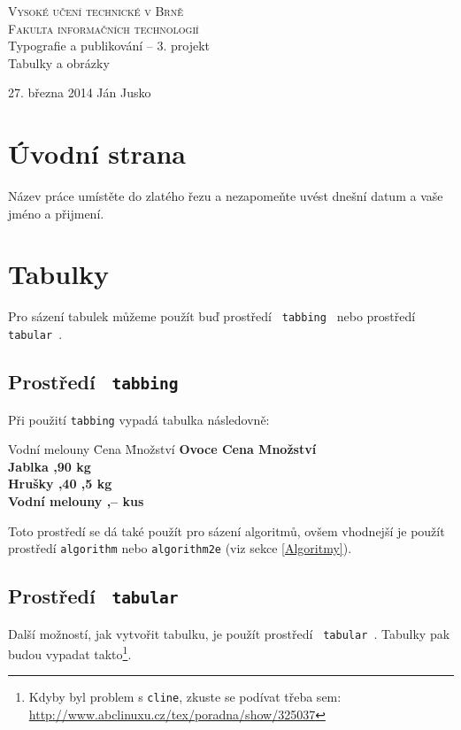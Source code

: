 \documentclass[a4paper,11pt]{article}
\begin{document}
\begin{titlepage}
\begin{center}
	\Huge
	\textsc{Vysoké učení technické v Brně\\
	\huge Fakulta informačních technologií}\\
{ \LARGE Typografie a publikování -- 3. projekt\\
\Huge Tabulky a obrázky\\}
\end{center}
{\Large 27. března 2014 \hfill
Ján Jusko}
\end{titlepage}

\newpage

\section{Úvodní strana}
Název práce umístěte do zlatého řezu a nezapomeňte uvést dnešní datum a vaše jméno a přijmení.

\section{Tabulky}
Pro sázení tabulek můžeme použít buď prostředí \verb| tabbing | nebo prostředí \verb| tabular |.

\subsection{Prostředí \texttt{ tabbing }}
Při použití \verb|tabbing| vypadá tabulka následovně:

\begin{tabbing}
Vodní melouny \quad \= Cena \quad \= Množství \kill
\bfseries{Ovoce} \> \bfseries{Cena} \> \bfseries{Množství} \\
Jablka ,90  kg \\
Hrušky ,40 ,5 kg \\
Vodní melouny ,--  kus \\
\end{tabbing}

\noindent Toto prostředí se dá také použít pro sázení algoritmů, ovšem vhodnejší je použít prostředí \verb|algorithm| nebo \verb|algorithm2e| (viz sekce \ref{Algoritmy}).

\subsection{Prostředí \texttt{ tabular }} 
Další možností, jak vytvořit tabulku, je použít prostředí \verb| tabular |. Tabulky pak budou vypadat takto\footnote{Kdyby byl problem s \texttt{cline}, zkuste se podívat třeba sem: \href{http://www.abclinuxu.cz/tex/poradna/show/325037}{http://www.abclinuxu.cz/tex/poradna/show/325037}}. 
\bigskip
\end{document}

